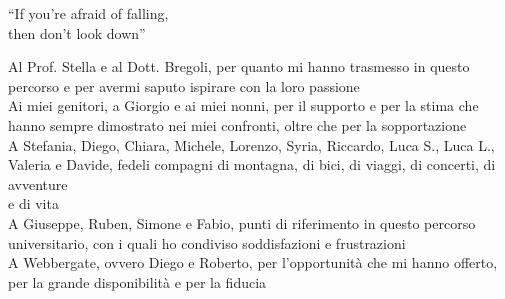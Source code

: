 \begingroup
  \let\clearpage\endgroup
  \null{}
  \begin{minipage}{5.3in}
  
    \begin{flushright}
      \begin{em}
        ``If you're afraid of falling,\\then don't look down''
      \end{em}

      \vspace{4cm}

      \begin{em}
        Al Prof. Stella e al Dott. Bregoli, per quanto mi hanno trasmesso in questo percorso e 
        per avermi saputo ispirare con la loro passione\\[10pt]
        Ai miei genitori, a Giorgio e ai miei nonni, per il supporto e per la stima che hanno sempre dimostrato nei miei confronti,
        oltre che per la sopportazione\\[10pt]
        A Stefania, Diego, Chiara, Michele, Lorenzo, Syria, Riccardo, Luca S., Luca L., Valeria e Davide, fedeli compagni di montagna, di bici,
        di viaggi, di concerti, di avventure\\e di vita\\[10pt]
        A Giuseppe, Ruben, Simone e Fabio, punti di riferimento in questo percorso universitario,
        con i quali ho condiviso soddisfazioni e frustrazioni\\[10pt]
        A Webbergate, ovvero Diego e Roberto, per l'opportunità che mi hanno offerto, per la grande disponibilità e per 
        la fiducia
      \end{em}
    \end{flushright}
  \end{minipage}
   \null
\endgroup